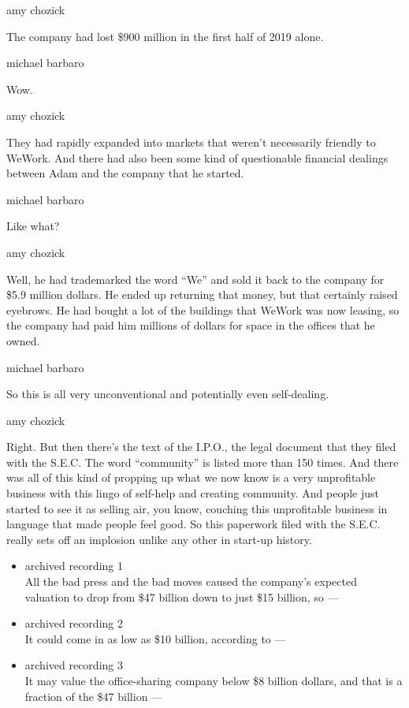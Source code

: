 amy chozick

The company had lost \$900 million in the first half of 2019 alone.

michael barbaro

Wow.

amy chozick

They had rapidly expanded into markets that weren't necessarily friendly
to WeWork. And there had also been some kind of questionable financial
dealings between Adam and the company that he started.

michael barbaro

Like what?

amy chozick

Well, he had trademarked the word ``We'' and sold it back to the company
for \$5.9 million dollars. He ended up returning that money, but that
certainly raised eyebrows. He had bought a lot of the buildings that
WeWork was now leasing, so the company had paid him millions of dollars
for space in the offices that he owned.

michael barbaro

So this is all very unconventional and potentially even self-dealing.

amy chozick

Right. But then there's the text of the I.P.O., the legal document that
they filed with the S.E.C. The word ``community'' is listed more than
150 times. And there was all of this kind of propping up what we now
know is a very unprofitable business with this lingo of self-help and
creating community. And people just started to see it as selling air,
you know, couching this unprofitable business in language that made
people feel good. So this paperwork filed with the S.E.C. really sets
off an implosion unlike any other in start-up history.

\begin{itemize}
\item
  archived recording 1\\
  All the bad press and the bad moves caused the company's expected
  valuation to drop from \$47 billion down to just \$15 billion, so ---
\item
  archived recording 2\\
  It could come in as low as \$10 billion, according to ---
\item
  archived recording 3\\
  It may value the office-sharing company below \$8 billion dollars, and
  that is a fraction of the \$47 billion ---
\end{itemize}

